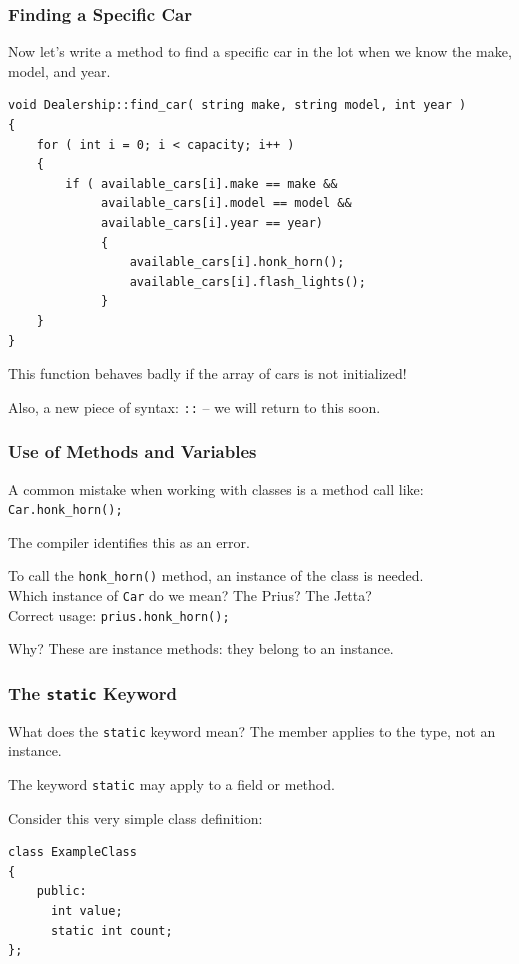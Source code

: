 \begin{frame}[fragile]
\frametitle{Finding a Specific Car}

Now let's write a method to find a specific car in the lot when we know the make, model, and year.

{\scriptsize
\begin{verbatim}
void Dealership::find_car( string make, string model, int year )
{
    for ( int i = 0; i < capacity; i++ )
    {
        if ( available_cars[i].make == make &&
             available_cars[i].model == model &&
             available_cars[i].year == year)
             {
                 available_cars[i].honk_horn();
                 available_cars[i].flash_lights();
             }
    }
}
\end{verbatim}
}

This function behaves badly if the array of cars is not initialized!

Also, a new piece of syntax: \texttt{::}  -- we will return to this soon.

\end{frame}



\begin{frame}
\frametitle{Use of Methods and Variables}
A common mistake when working with classes is a method call like:\\
\quad \texttt{Car.honk\_horn();}

The compiler identifies this as an error. 

To call the \texttt{honk\_horn()} method, an instance of the class is needed.\\
\quad Which instance of \texttt{Car} do we mean? The Prius? The Jetta?\\
\quad Correct usage: \texttt{prius.honk\_horn();}

Why? These are \alert{instance methods}: they belong to an instance. 


\end{frame}

\begin{frame}[fragile]
\frametitle{The \texttt{static} Keyword}
What does the \texttt{static} keyword mean? The member applies to the type, not an instance.

The keyword \texttt{static} may apply to a field or method.

Consider this very simple class definition:
\begin{verbatim}
class ExampleClass
{
    public:
      int value;
      static int count;
};
\end{verbatim}

\end{frame}

